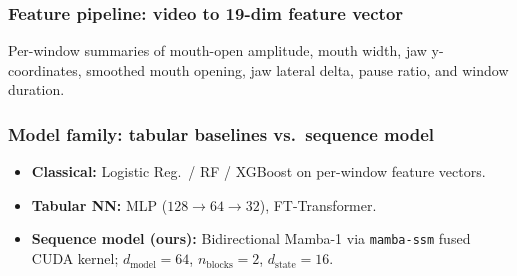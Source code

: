 \documentclass[aspectratio=169]{beamer}
\begin{document}
\begin{frame}
  \frametitle{Feature pipeline: video to 19-dim feature vector}
  Per-window summaries of mouth-open amplitude, mouth width, jaw y-coordinates, smoothed mouth opening, jaw lateral delta, pause ratio, and window duration.

  \vspace{0.5em}
  \begin{center}
  \end{center}
\end{frame}

\begin{frame}
  \frametitle{Model family: tabular baselines vs.\ sequence model}
  \begin{itemize}
    \item \textbf{Classical:} Logistic Reg.\ / RF / XGBoost on per-window feature vectors.
    \item \textbf{Tabular NN:} MLP ($128\!\to\!64\!\to\!32$), FT-Transformer.
    \item \textbf{Sequence model (ours):} Bidirectional Mamba-1 via \texttt{mamba-ssm} fused CUDA kernel; $d_\text{model}=64$, $n_\text{blocks}=2$, $d_\text{state}=16$.
  \end{itemize}
\end{frame}
\end{document}

